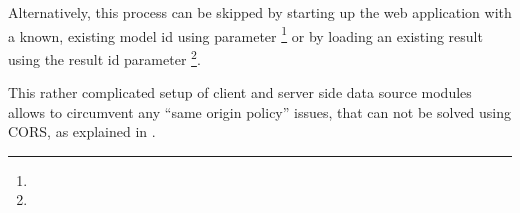 Alternatively, this process can be skipped by starting up the web application with a known, existing model id using  parameter \footnote{\splurl[?mid=42]} or by loading an existing result using the result id  parameter \footnote{\splurl[?rid=1337]}.

This rather complicated setup of client and server side data source modules allows to circumvent any ``same origin policy'' issues, that can not be solved using CORS, as explained in .



